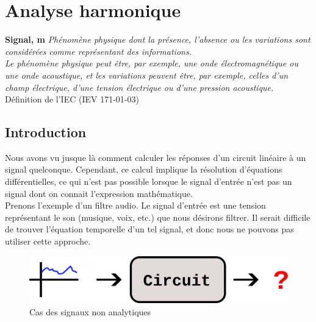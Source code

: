 \chapter{Analyse harmonique}

\begin{minipage}{0.8\textwidth}
	\textbf{Signal, m} \textit{Phénomène physique dont la présence, l'absence ou les variations sont considérées comme représentant des informations.}\\

	\textit{Le phénomène physique peut être, par exemple, une onde électromagnétique ou une onde acoustique, et les variations peuvent être, par exemple, celles d’un champ électrique, d’une tension électrique ou d’une pression acoustique.} \\ 

	\hspace*{0pt}\hfill Définition de l'IEC (IEV 171-01-03)
\end{minipage}

\section{Introduction}

Nous avons vu jusque là comment calculer les réponses d'un circuit linéaire à un signal quelconque. Cependant, ce calcul implique la résolution d'équations différentielles, ce qui n'est pas possible lorsque le signal d'entrée n'est pas un signal dont on connait l'expression mathématique. \\

Prenons l'exemple d'un filtre audio. Le signal d'entrée est une tension représentant le son (musique, voix, etc.) que nous désirons filtrer. Il serait difficile de trouver l'équation temporelle d'un tel signal, et donc nous ne pouvons pas utiliser cette approche. \\

\begin{figure}[!h]
\begin{center}
\includegraphics{part01/chap07/intro01.png}
\end{center}
	\caption{ Cas des signaux non analytiques}
\end{figure}


